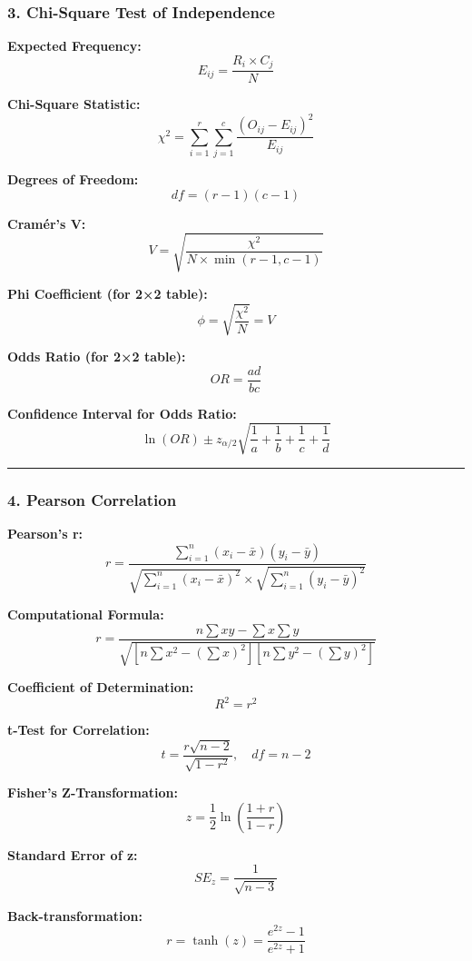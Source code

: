 \documentclass[11pt]{article}
\begin{document}
\subsubsection{\texorpdfstring{\textbf{3. Chi-Square Test of
Independence}}{3. Chi-Square Test of Independence}}\label{chi-square-test-of-independence}

\textbf{Expected Frequency:} \[E_{ij} = \frac{R_i \times C_j}{N}\]

\textbf{Chi-Square Statistic:}
\[\chi^2 = \sum_{i=1}^{r}\sum_{j=1}^{c} \frac{(O_{ij} - E_{ij})^2}{E_{ij}}\]

\textbf{Degrees of Freedom:} \[df = (r-1)(c-1)\]

\textbf{Cramér's V:}
\[V = \sqrt{\frac{\chi^2}{N \times \min(r-1, c-1)}}\]

\textbf{Phi Coefficient (for 2×2 table):}
\[\phi = \sqrt{\frac{\chi^2}{N}} = V\]

\textbf{Odds Ratio (for 2×2 table):} \[OR = \frac{ad}{bc}\]

\textbf{Confidence Interval for Odds Ratio:}
\[\ln(OR) \pm z_{\alpha/2}\sqrt{\frac{1}{a} + \frac{1}{b} + \frac{1}{c} + \frac{1}{d}}\]

\begin{center}\rule{0.5\linewidth}{0.5pt}\end{center}

\subsubsection{\texorpdfstring{\textbf{4. Pearson
Correlation}}{4. Pearson Correlation}}\label{pearson-correlation}

\textbf{Pearson's r:}
\[r = \frac{\sum_{i=1}^{n}(x_i - \bar{x})(y_i - \bar{y})}{\sqrt{\sum_{i=1}^{n}(x_i - \bar{x})^2} \times \sqrt{\sum_{i=1}^{n}(y_i - \bar{y})^2}}\]

\textbf{Computational Formula:}
\[r = \frac{n\sum xy - \sum x \sum y}{\sqrt{[n\sum x^2 - (\sum x)^2][n\sum y^2 - (\sum y)^2]}}\]

\textbf{Coefficient of Determination:} \[R^2 = r^2\]

\textbf{t-Test for Correlation:}
\[t = \frac{r\sqrt{n-2}}{\sqrt{1-r^2}}, \quad df = n-2\]

\textbf{Fisher's Z-Transformation:}
\[z = \frac{1}{2}\ln\left(\frac{1+r}{1-r}\right)\]

\textbf{Standard Error of z:} \[SE_z = \frac{1}{\sqrt{n-3}}\]

\textbf{Back-transformation:}
\[r = \tanh(z) = \frac{e^{2z}-1}{e^{2z}+1}\]
\end{document}
